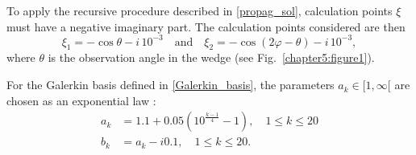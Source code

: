 To apply the recursive procedure described in \ref{propag_sol}, calculation points $\xi$ must have a negative imaginary part. The calculation points considered are then
\begin{equation}
\label{calculation_points_recursive}
\xi_1 = -\cos \theta -i\,10^{-3}  \quad \text{and} \quad \xi_2=- \cos (2\varphi - \theta) - i\, 10^{-3} ,
\end{equation}
where $\theta$ is the observation angle in the wedge (see Fig.~\ref{chapter5:figure1}).

For the Galerkin basis defined in \eqref{Galerkin_basis}, the parameters $a_k \in [1,\infty[$ are chosen as an exponential law \cite{CroisilleLebeau}:
\begin{equation}
\begin{split}
\label{bas_Gal}
a_k &= 1.1 + 0.05 \left( 10^{\frac{k -1}{4}} - 1 \right), \quad 1\leq k\leq 20 \\
b_k &= a_k  - i 0.1, \quad 1\leq k\leq 20 .
\end{split}
\end{equation}

